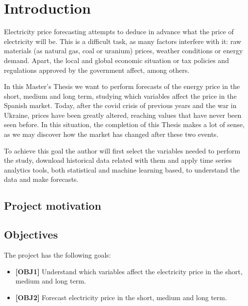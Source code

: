 \chapter{Introduction}
Electricity price forecasting attempts to deduce in advance what the price of electricity will be.
This is a difficult task, as many factors interfere with it: raw materials (as natural gas, coal or uranium) prices, weather conditions or energy demand.
Apart, the local and global economic situation or tax policies and regulations approved by the government affect, among others.

In this Master's Thesis we want to perform forecasts of the energy price in the short, medium and long term, studying which variables affect the price in the Spanish market.
Today, after the covid crisis of previous years and the war in Ukraine, prices have been greatly altered, reaching values that have never been seen before.
In this situation, the completion of this Thesis makes a lot of sense, as we may discover how the market has changed after these two events.

To achieve this goal the author will first select the variables needed to perform the study, download historical data related with them and apply time series analytics tools, both statistical and machine learning based, to understand the data and make forecasts.

\section{Project motivation}


\section{Objectives}
The project has the following goals:
\begin{itemize}
    \item \textbf{[OBJ1]} Understand which variables affect the electricity price in the short, medium and long term.
    \item \textbf{[OBJ2]} Forecast electricity price in the short, medium and long term.
\end{itemize}